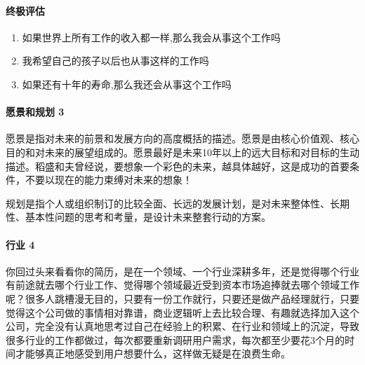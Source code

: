 \documentclass[letterpaper,11pt,english]{sphinxmanual}
\begin{document}
\paragraph{终极评估}
\label{\detokenize{chapter_interview/choose:id5}}\begin{enumerate}
%
\item {} 
如果世界上所有工作的收入都一样,那么我会从事这个工作吗

\item {} 
我希望自己的孩子以后也从事这样的工作吗

\item {} 
如果还有十年的寿命,那么我还会从事这个工作吗

\end{enumerate}


\paragraph{愿景和规划 3\sphinxfootnotemark[757]}
\label{\detokenize{chapter_interview/choose:id6}}%
\begin{footnotetext}[757]\sphinxAtStartFootnote
{}
%
\end{footnotetext}\ignorespaces 
愿景是指对未来的前景和发展方向的高度概括的描述。愿景是由核心价值观、核心目的和对未来的展望组成的。愿景最好是未来10年以上的远大目标和对目标的生动描述。稻盛和夫曾经说，要想象一个彩色的未来，越具体越好，这是成功的首要条件，不要以现在的能力束缚对未来的想象！

规划是指个人或组织制订的比较全面、长远的发展计划，是对未来整体性、长期性、基本性问题的思考和考量，是设计未来整套行动的方案。


\paragraph{行业 4\sphinxfootnotemark[758]}
\label{\detokenize{chapter_interview/choose:id7}}%
\begin{footnotetext}[758]\sphinxAtStartFootnote
{}
%
\end{footnotetext}\ignorespaces 
你回过头来看看你的简历，是在一个领域、一个行业深耕多年，还是觉得哪个行业有前途就去哪个行业工作、觉得哪个领域最近受到资本市场追捧就去哪个领域工作呢？很多人跳槽漫无目的，只要有一份工作就行，只要还是做产品经理就行，只要觉得这个公司做的事情相对靠谱，商业逻辑听上去比较合理、有趣就选择加入这个公司，完全没有认真地思考过自己在经验上的积累、在行业和领域上的沉淀，导致很多行业的工作都做过，每次都要重新调研用户需求，每次都至少要花3个月的时间才能够真正地感受到用户想要什么，这样做无疑是在浪费生命。
\end{document}
